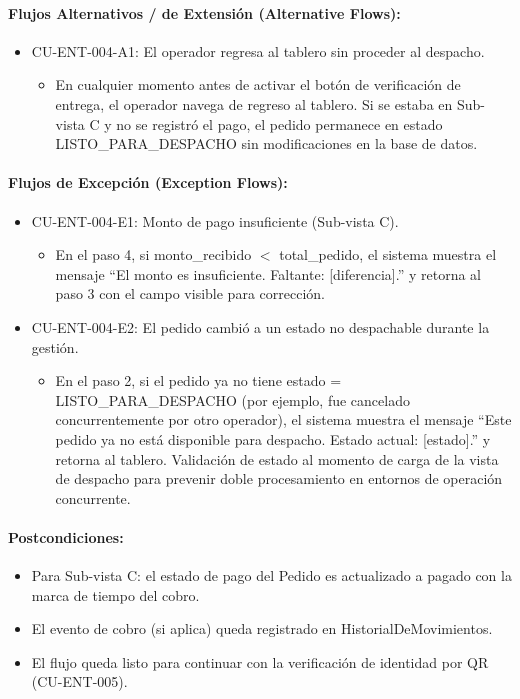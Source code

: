 \paragraph{Flujos Alternativos / de Extensión (Alternative Flows):}
\begin{itemize}
    \item CU-ENT-004-A1: El operador regresa al tablero sin proceder al despacho.
    \begin{itemize}
        \item En cualquier momento antes de activar el botón de verificación de entrega, el operador navega de regreso al tablero. Si se estaba en Sub-vista C y no se registró el pago, el pedido permanece en estado LISTO\_PARA\_DESPACHO sin modificaciones en la base de datos.
    \end{itemize}
\end{itemize}

\paragraph{Flujos de Excepción (Exception Flows):}
\begin{itemize}
    \item CU-ENT-004-E1: Monto de pago insuficiente (Sub-vista C).
    \begin{itemize}
        \item En el paso 4, si monto\_recibido $<$ total\_pedido, el sistema muestra el mensaje ``El monto es insuficiente. Faltante: [diferencia].'' y retorna al paso 3 con el campo visible para corrección.
    \end{itemize}
    \item CU-ENT-004-E2: El pedido cambió a un estado no despachable durante la gestión.
    \begin{itemize}
        \item En el paso 2, si el pedido ya no tiene estado = LISTO\_PARA\_DESPACHO (por ejemplo, fue cancelado concurrentemente por otro operador), el sistema muestra el mensaje ``Este pedido ya no está disponible para despacho. Estado actual: [estado].'' y retorna al tablero. Validación de estado al momento de carga de la vista de despacho para prevenir doble procesamiento en entornos de operación concurrente.
    \end{itemize}
\end{itemize}

\paragraph{Postcondiciones:}
\begin{itemize}
    \item Para Sub-vista C: el estado de pago del Pedido es actualizado a pagado con la marca de tiempo del cobro.
    \item El evento de cobro (si aplica) queda registrado en HistorialDeMovimientos.
    \item El flujo queda listo para continuar con la verificación de identidad por QR (CU-ENT-005).
\end{itemize}

